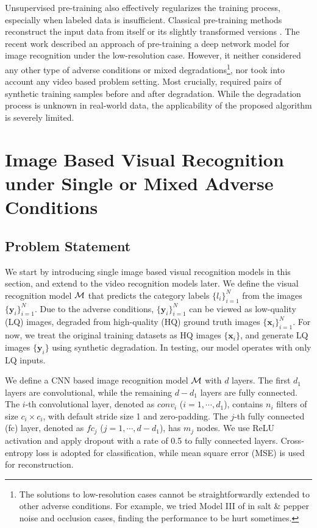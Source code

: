 \documentclass[10pt,twocolumn,twoside]{IEEEtran} %
\begin{document}
Unsupervised pre-training \cite{erhan2009difficulty} also effectively regularizes the training process, especially when labeled data is insufficient. Classical pre-training methods reconstruct the input data from itself \cite{erhan2009difficulty} or its slightly transformed versions \cite{masci2011stacked}. 
The recent work \cite{vlrr} described an approach of
pre-training a deep network model for image recognition under the low-resolution case. 
However, it neither considered any other type of adverse conditions or mixed degradations\footnote{The  solutions to low-resolution cases cannot be straightforwardly extended to other adverse conditions. For example, we tried Model III of \cite{vlrr} in salt \& pepper noise and occlusion cases, finding the performance to be hurt sometimes.}, nor took into account any video based problem setting. Most crucially, \cite{vlrr} required pairs of synthetic training samples before and after degradation. While the degradation process is unknown in real-world data, the applicability of the proposed algorithm is severely limited.


\section{Image Based Visual Recognition under Single or Mixed Adverse Conditions}\label{sec:image}\subsection{Problem Statement}

We start by introducing single image based visual recognition models in this section, and extend to the video recognition models later. 
We define the visual recognition model ${\mathcal{M}}$ that predicts the category labels $\{l_i\}_{i=1}^N$ from the images $\{\mathbf{y}_i\}_{i=1}^N$. Due to the adverse conditions, $\{\mathbf{y}_i\}_{i=1}^N$ can be viewed as low-quality (LQ) images, degraded from high-quality (HQ) ground truth images $\{\mathbf{x}_i\}_{i=1}^N$. For now, we treat the original training datasets as HQ images $\{\mathbf{x}_i\}$, and generate LQ images $\{\mathbf{y}_i\}$ using synthetic degradation. In testing, our model operates with only LQ inputs.

We define a CNN based image recognition model ${\mathcal{M}}$ with $d$ layers. The first $d_1$ layers are convolutional, while the remaining $d - d_1$ layers are fully connected. The $i$-th convolutional layer, denoted as $conv_i$ ($i = 1, \cdots, d_1$), contains $n_i$ filters of size $c_i \times c_i$, with default stride size 1 and zero-padding. The $j$-th fully connected (fc) layer, denoted as $fc_j$ ($j =  1, \cdots, d - d_1$), has $m_j$ nodes. We use ReLU activation and apply dropout with a rate of 0.5 to fully connected layers. Cross-entropy loss is adopted for classification, while mean square error (MSE) is used for reconstruction. 
\end{document}
